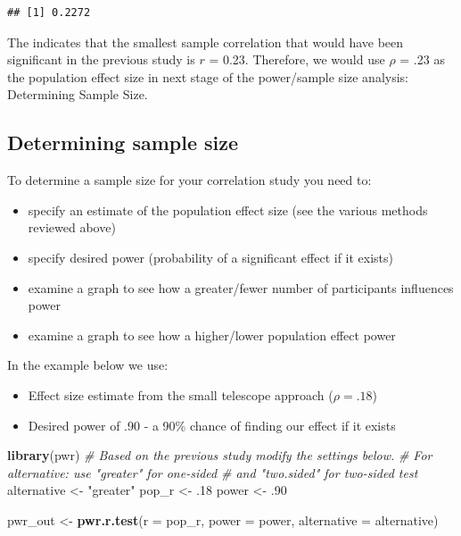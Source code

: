 \documentclass[
]{krantz}
\makeatletter
\newenvironment{Shaded}{\begin{snugshade}}{\end{snugshade}}
\newcommand{\CommentTok}[1]{\textcolor[rgb]{0.37,0.37,0.37}{\textit{#1}}}
\newcommand{\DataTypeTok}[1]{\textcolor[rgb]{0.27,0.27,0.27}{#1}}
\newcommand{\FloatTok}[1]{\textcolor[rgb]{0.06,0.06,0.06}{#1}}
\newcommand{\KeywordTok}[1]{\textcolor[rgb]{0.27,0.27,0.27}{\textbf{#1}}}
\newcommand{\NormalTok}[1]{#1}
\newcommand{\StringTok}[1]{\textcolor[rgb]{0.5,0.5,0.5}{#1}}
\newenvironment{kframe}{%
\medskip{}
\setlength{\fboxsep}{.8em}
 \def\at@end@of@kframe{}%
 \ifinner\ifhmode%
  \def\at@end@of@kframe{\end{minipage}}%
  \begin{minipage}{\columnwidth}%
 \fi\fi%
 \def\FrameCommand##1{\hskip\@totalleftmargin \hskip-\fboxsep
 \colorbox{shadecolor}{##1}\hskip-\fboxsep
     \hskip-\linewidth \hskip-\@totalleftmargin \hskip\columnwidth}%
 \MakeFramed {\advance\hsize-\width
   \@totalleftmargin\z@ \linewidth\hsize
   \@setminipage}}%
 {\par\unskip\endMakeFramed%
 \at@end@of@kframe}
\renewenvironment{Shaded}{\begin{kframe}}{\end{kframe}}
\makeatother
\begin{document}
\begin{verbatim}
## [1] 0.2272
\end{verbatim}

The indicates that the smallest sample correlation that would have been significant in the previous study is \(r\) = 0.23. Therefore, we would use \(\rho\) = .23 as the population effect size in next stage of the power/sample size analysis: Determining Sample Size.

\hypertarget{determining-sample-size-2}{%
\subsection{Determining sample size}\label{determining-sample-size-2}}

To determine a sample size for your correlation study you need to:

\begin{itemize}
\item
  specify an estimate of the population effect size (see the various methods reviewed above)
\item
  specify desired power (probability of a significant effect if it exists)
\item
  examine a graph to see how a greater/fewer number of participants influences power
\item
  examine a graph to see how a higher/lower population effect power
\end{itemize}

In the example below we use:

\begin{itemize}
\item
  Effect size estimate from the small telescope approach (\(\rho = .18\))
\item
  Desired power of .90 - a 90\% chance of finding our effect if it exists
\end{itemize}

\begin{Shaded}
\begin{Highlighting}[]
\KeywordTok{library}\NormalTok{(pwr)}
\CommentTok{# Based on the previous study modify the settings below.}
\CommentTok{# For alternative: use "greater" for one-sided }
\CommentTok{# and "two.sided" for two-sided test}
\NormalTok{alternative <-}\StringTok{ "greater"}
\NormalTok{pop_r <-}\StringTok{ }\FloatTok{.18}
\NormalTok{power <-}\StringTok{ }\FloatTok{.90}

\NormalTok{pwr_out <-}\StringTok{ }\KeywordTok{pwr.r.test}\NormalTok{(}\DataTypeTok{r =}\NormalTok{ pop_r, }
                      \DataTypeTok{power =}\NormalTok{ power,}
                      \DataTypeTok{alternative =}\NormalTok{ alternative)}
\end{Highlighting}
\end{Shaded}
\end{document}

